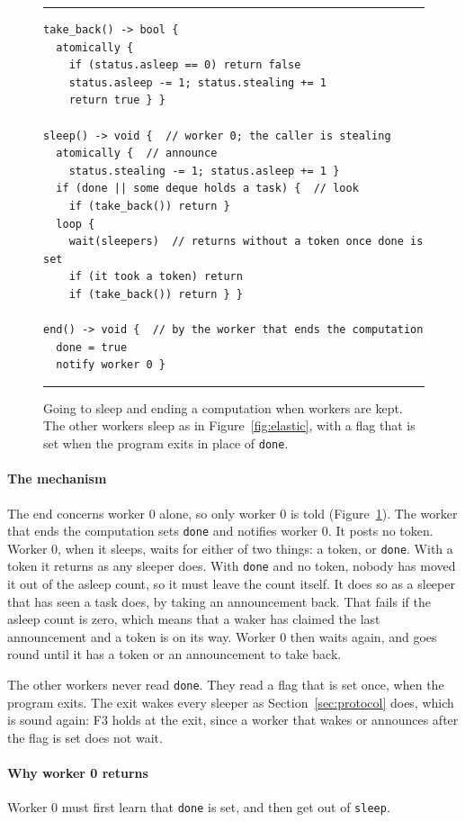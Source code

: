 \documentclass[sigplan,nonacm]{acmart}
\begin{document}
\begin{figure}
\hrule
\begin{lstlisting}
take_back() -> bool {
  atomically {
    if (status.asleep == 0) return false
    status.asleep -= 1; status.stealing += 1
    return true } }

sleep() -> void {  // worker 0; the caller is stealing
  atomically {  // announce
    status.stealing -= 1; status.asleep += 1 }
  if (done || some deque holds a task) {  // look
    if (take_back()) return }
  loop {
    wait(sleepers)  // returns without a token once done is set
    if (it took a token) return
    if (take_back()) return } }

end() -> void {  // by the worker that ends the computation
  done = true
  notify worker 0 }
\end{lstlisting}
\hrule
\caption{Going to sleep and ending a computation when workers are
  kept. The other workers sleep as in Figure~\ref{fig:elastic}, with a
  flag that is set when the program exits in place of
  \lstinline|done|.}
\label{fig:pool}
\end{figure}

\paragraph{The mechanism}
%
The end concerns worker 0 alone, so only worker 0 is told
(Figure~\ref{fig:pool}).
%
The worker that ends the computation sets \lstinline|done| and
notifies worker 0.
%
It posts no token.
%
Worker 0, when it sleeps, waits for either of two things: a token, or
\lstinline|done|.
%
With a token it returns as any sleeper does.
%
With \lstinline|done| and no token, nobody has moved it out of the
asleep count, so it must leave the count itself.
%
It does so as a sleeper that has seen a task does, by taking an
announcement back.
%
That fails if the asleep count is zero, which means that a waker has
claimed the last announcement and a token is on its way.
%
Worker 0 then waits again, and goes round until it has a token or an
announcement to take back.

The other workers never read \lstinline|done|.
%
They read a flag that is set once, when the program exits.
%
The exit wakes every sleeper as Section~\ref{sec:protocol} does, which
is sound again: F3 holds at the exit, since a worker that wakes or
announces after the flag is set does not wait.

\paragraph{Why worker 0 returns}
%
Worker 0 must first learn that \lstinline|done| is set, and then get
out of \lstinline|sleep|.
\end{document}
